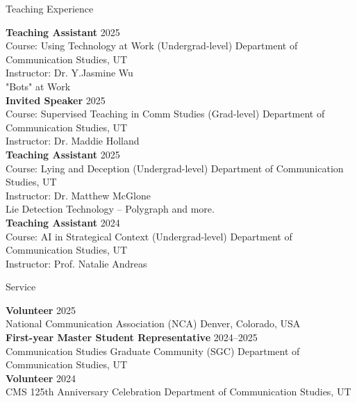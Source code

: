 \documentclass[
	11pt, %
]{resume} %
\begin{document}

\begin{rSection}{Teaching Experience}
	
    \textbf{Teaching Assistant} \hfill 2025 \\ 
    Course: Using Technology at Work (Undergrad-level) \hfill Department of Communication Studies, UT \\
    Instructor: Dr. Y.Jasmine Wu\\
\textbullet{} "Bots" at Work\\

    \textbf{Invited Speaker} \hfill 2025 \\ 
    Course: Supervised Teaching in Comm Studies (Grad-level) \hfill Department of Communication Studies, UT \\
    Instructor: Dr. Maddie Holland\\

    \textbf{Teaching Assistant} \hfill 2025 \\ 
    Course: Lying and Deception (Undergrad-level) \hfill Department of Communication Studies, UT \\
    Instructor: Dr. Matthew McGlone\\
\textbullet{} Lie Detection Technology – Polygraph and more.\\

    \textbf{Teaching Assistant} \hfill 2024 \\ 
    Course: AI in Strategical Context (Undergrad-level) \hfill Department of Communication Studies, UT \\
    Instructor: Prof. Natalie Andreas\\
    
\end{rSection}




\begin{rSection}{Service}
	
    \textbf{Volunteer} \hfill 2025 \\ 
    National Communication Association (NCA)  \hfill Denver, Colorado, USA \\

    \textbf{First-year Master Student Representative} \hfill 2024--2025 \\ 
    Communication Studies Graduate Community (SGC)  \hfill Department of Communication Studies, UT \\

    \textbf{Volunteer} \hfill 2024 \\ 
    CMS 125th Anniversary Celebration   \hfill Department of Communication Studies, UT \\

    
\end{rSection}
\end{document}
